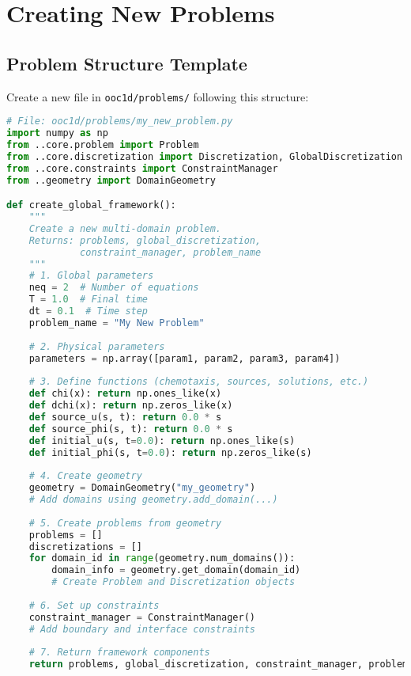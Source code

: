 \documentclass[11pt,a4paper]{article}
\newcommand{\code}[1]{\texttt{#1}}
\begin{document}
\section{Creating New Problems}

\subsection{Problem Structure Template}

Create a new file in \code{ooc1d/problems/} following this structure:

\begin{lstlisting}[language=Python, caption={Problem Template Structure}]
# File: ooc1d/problems/my_new_problem.py
import numpy as np
from ..core.problem import Problem
from ..core.discretization import Discretization, GlobalDiscretization
from ..core.constraints import ConstraintManager
from ..geometry import DomainGeometry

def create_global_framework():
    """
    Create a new multi-domain problem.
    Returns: problems, global_discretization, 
             constraint_manager, problem_name
    """
    # 1. Global parameters
    neq = 2  # Number of equations
    T = 1.0  # Final time
    dt = 0.1  # Time step
    problem_name = "My New Problem"
    
    # 2. Physical parameters
    parameters = np.array([param1, param2, param3, param4])
    
    # 3. Define functions (chemotaxis, sources, solutions, etc.)
    def chi(x): return np.ones_like(x)
    def dchi(x): return np.zeros_like(x)
    def source_u(s, t): return 0.0 * s
    def source_phi(s, t): return 0.0 * s
    def initial_u(s, t=0.0): return np.ones_like(s)
    def initial_phi(s, t=0.0): return np.zeros_like(s)
    
    # 4. Create geometry
    geometry = DomainGeometry("my_geometry")
    # Add domains using geometry.add_domain(...)
    
    # 5. Create problems from geometry
    problems = []
    discretizations = []
    for domain_id in range(geometry.num_domains()):
        domain_info = geometry.get_domain(domain_id)
        # Create Problem and Discretization objects
    
    # 6. Set up constraints
    constraint_manager = ConstraintManager()
    # Add boundary and interface constraints
    
    # 7. Return framework components
    return problems, global_discretization, constraint_manager, problem_name
\end{lstlisting}
\end{document}
